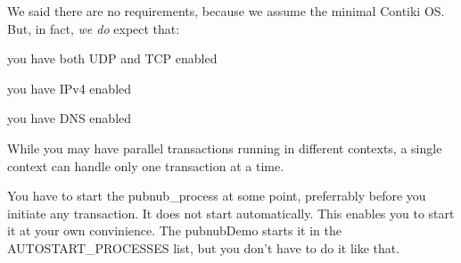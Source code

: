 \begin{DoxyItemize}
\item We said there are no requirements, because we assume the minimal Contiki O\-S. But, in fact, {\itshape we do} expect that\-:
\begin{DoxyItemize}
\item you have both U\-D\-P and T\-C\-P enabled
\item you have I\-Pv4 enabled
\item you have D\-N\-S enabled
\end{DoxyItemize}
\item While you may have parallel transactions running in different contexts, a single context can handle only one transaction at a time.
\item You have to start the {\ttfamily pubnub\-\_\-process} at some point, preferrably before you initiate any transaction. It does not start automatically. This enables you to start it at your own convinience. The pubnub\-Demo starts it in the {\ttfamily A\-U\-T\-O\-S\-T\-A\-R\-T\-\_\-\-P\-R\-O\-C\-E\-S\-S\-E\-S} list, but you don't have to do it like that. 
\end{DoxyItemize}